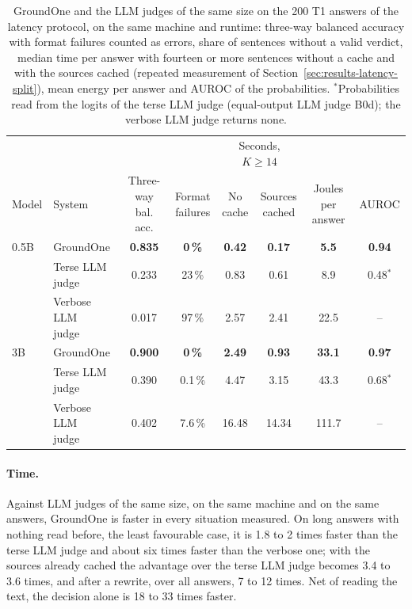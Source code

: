 \begin{table}[htbp]
\centering
\caption{GroundOne and the LLM judges of the same size on the 200 T1 answers of the latency protocol, on the same
machine and runtime: three-way balanced accuracy with format failures counted as errors, share of sentences without a
valid verdict, median time per answer with fourteen or more sentences without a cache and with the sources cached
(repeated measurement of Section~\ref{sec:results-latency-split}), mean energy per answer and AUROC of the
probabilities. $^{*}$Probabilities read from the logits of the terse LLM judge (equal-output LLM judge B0d); the
verbose LLM judge returns none.}
\label{tab:results-summary-device}
\small
\setlength{\tabcolsep}{3pt}
\begin{tabular}{llcccccc}
\toprule
 & & & & \multicolumn{2}{c}{Seconds, $K \geq 14$} & & \\
\cmidrule(lr){5-6}
Model & System & \makecell{Three-way\\bal. acc.} & \makecell{Format\\failures} & \makecell{No\\cache} & \makecell{Sources\\cached} & \makecell{Joules per\\answer} & AUROC \\
\midrule
0.5B & GroundOne & \textbf{0.835} & \textbf{0\,\%} & \textbf{0.42} & \textbf{0.17} & \textbf{5.5} & \textbf{0.94} \\
 & \makecell[l]{Terse LLM\\judge} & 0.233 & 23\,\% & 0.83 & 0.61 & 8.9 & 0.48$^{*}$ \\
 & \makecell[l]{Verbose LLM\\judge} & 0.017 & 97\,\% & 2.57 & 2.41 & 22.5 & -- \\
\midrule
3B & GroundOne & \textbf{0.900} & \textbf{0\,\%} & \textbf{2.49} & \textbf{0.93} & \textbf{33.1} & \textbf{0.97} \\
 & \makecell[l]{Terse LLM\\judge} & 0.390 & 0.1\,\% & 4.47 & 3.15 & 43.3 & 0.68$^{*}$ \\
 & \makecell[l]{Verbose LLM\\judge} & 0.402 & 7.6\,\% & 16.48 & 14.34 & 111.7 & -- \\
\bottomrule
\end{tabular}
\end{table}

\paragraph{Time.} Against LLM judges of the same size, on the same machine and on the same answers, GroundOne is
faster in every situation measured. On long answers with nothing read before, the least favourable case, it is 1.8 to
2 times faster than the terse LLM judge and about six times faster than the verbose one; with the sources already
cached the advantage over the terse LLM judge becomes 3.4 to 3.6 times, and after a rewrite, over all answers, 7 to 12
times. Net of reading the text, the decision alone is 18 to 33 times faster.

